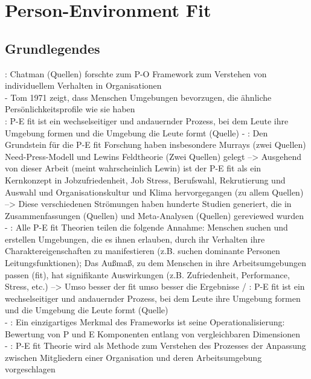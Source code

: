 \chapter{Person-Environment Fit}
\label{ch:personEnvironmentFit}

\section{Grundlegendes}
\label{ch:personEnvironmentFit:grundlegendes}
\cite[S. 2]{schneider:1995}: Chatman (Quellen) forschte zum P-O Framework zum Verstehen von individuellem Verhalten in Organisationen\\
- Tom 1971 zeigt, dass Menschen Umgebungen bevorzugen, die ähnliche Persönlichkeitsprofile wie sie haben \\
\cite[S. 3]{su:2015}: P-E fit ist ein wechselseitiger und andauernder Prozess, bei dem Leute ihre Umgebung formen und die Umgebung die Leute formt (Quelle)
- \cite[S. 2]{edwards:2008}: Den Grundstein für die P-E fit Forschung haben insbesondere Murrays (zwei Quellen) Need-Press-Modell und Lewins Feldtheorie (Zwei Quellen) gelegt --> Ausgehend von dieser Arbeit (meint wahrscheinlich Lewin) ist der P-E fit als ein Kernkonzept in Jobzufriedenheit, Job Stress, Berufswahl, Rekrutierung und Auswahl und Organisationskultur und Klima hervorgegangen (zu allem Quellen) --> Diese verschiedenen Strömungen haben hunderte Studien generiert, die in Zusammenfassungen (Quellen) und Meta-Analysen (Quellen) gereviewed wurden \\
- \cite[S. 3]{su:2015}: Alle P-E fit Theorien teilen die folgende Annahme: Menschen suchen und erstellen Umgebungen, die es ihnen erlauben, durch ihr Verhalten ihre Charaktereigenschaften zu manifestieren (z.B. suchen dominante Personen Leitungsfunktionen); Das Außmaß, zu dem Menschen in ihre Arbeitsumgebungen passen (fit), hat signifikante Auswirkungen (z.B. Zufriedenheit, Performance, Stress, etc.) --> Umso besser der fit umso besser die Ergebnisse / \cite[S. 3]{su:2015}: P-E fit ist ein wechselseitiger und andauernder Prozess, bei dem Leute ihre Umgebung formen und die Umgebung die Leute formt (Quelle) \\
- \cite[S. 1]{caplan:1987}: Ein einzigartiges Merkmal des Frameworks ist seine Operationalisierung: Bewertung von P und E  Komponenten entlang von vergleichbaren Dimensionen \\
- \cite[S. 2]{caplan:1987}: P-E fit Theorie wird als Methode zum Verstehen des Prozesses der Anpassung zwischen Mitgliedern einer Organisation und deren Arbeitsumgebung vorgeschlagen \\
